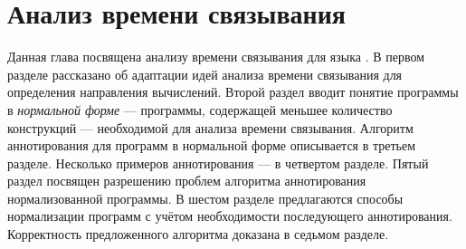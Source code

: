 \section{Анализ времени связывания}
\label{annotator}

Данная глава посвящена анализу времени связывания для языка \miniKanren{}.
В первом разделе рассказано об адаптации идей анализа времени связывания для определения направления вычислений.
Второй раздел вводит понятие программы в \textit{нормальной форме} --- программы, содержащей меньшее количество конструкций --- необходимой для анализа времени связывания.
Алгоритм аннотирования для программ в нормальной форме описывается в третьем разделе.
Несколько примеров аннотирования --- в четвертом разделе.
Пятый раздел посвящен разрешению проблем алгоритма аннотирования нормализованной программы.
В шестом разделе предлагаются способы нормализации программ с учётом необходимости последующего аннотирования.
Корректность предложенного алгоритма доказана в седьмом разделе.








